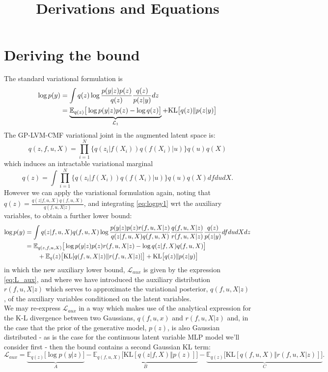 \documentclass[12pt]{article}
\title{\textbf{Derivations and Equations}}
\date{}
\begin{document}
\maketitle


\section{Deriving the bound} %
\label{sec:derive_bound}
The standard variational formulation is
%
\begin{align}
    \log p(y) &= \int q(z)\log\frac{p(y|z)p(z)}{q(z)}\frac{q(z)}{p(z|y)} dz\notag\\
    &= \underbrace{\mathbb{E}_{q(z)}\big[ \log p(y|z)p(z) - \log q(z) \big]}_{\mathcal{L}_1} + \text{KL}\big[ q(z)\Vert p(z|y) \big]\label{eq:logpy1}
\end{align}
%
The GP-LVM-CMF variational joint in the augmented latent space is:
%
\begin{equation}
    q(z,f,u,X) = \prod_{i=1}^N \{q(z_i|f(X_i))q(f(X_i)|u)\}q(u)q(X)
\end{equation}
%
which induces an intractable variational marginal
%
\begin{equation}
    q(z) = \int \prod_{i=1}^N \{q(z_i|f(X_i))q(f(X_i)|u)\}q(u)q(X) df du dX.
\end{equation}
%
However we can apply the variational formulation again, noting that $q(z) = \frac{q(z|f,u,X)q(f,u,X)}{q(f,u,X|z)}$, and integrating \ref{eq:logpy1} wrt the auxiliary variables, to obtain a further lower bound:
\begin{align}
    \log p(y) &= \int q(z|f,u,X)q(f,u,X)\log \frac{p(y|z)p(z)r(f,u,X|z)}{q(z|f,u,X)q(f,u,X)}\frac{q(f,u,X|z)}{r(f,u,X|z)}\frac{q(z)}{p(z|y)} df du dX dz\notag\\
    &= \mathbb{E}_{q(z,f,u,X)}\big[ \log p(y|z)p(z)r(f,u,X|z) - \log q(z|f,X)q(f,u,X) \big]\label{eq:L_aux}\\
    &\qquad+ \mathbb{E}_q(z)\big[ \text{KL}[q(f,u,X|z)\Vert r(f,u,X|z)] \big] + \text{KL}\big[ q(z)\Vert p(z|y) \big]
\end{align}
%
in which the new auxiliary lower bound, $\mathcal{L}_{aux}$ is given by the expression \ref{eq:L_aux}, and where we have introduced the auxiliary distribution $r(f,u,X|z)$ which serves to approximate the variational posterior, $q(f,u,X|z)$, of the auxiliary variables conditioned on the latent variables.\\
We may re-express $\mathcal{L}_{aux}$ in a way which makes use of the analytical expression for the K-L divergence between two Gaussians, $q(f,u,x)$ and $r(f,u,X|z)$ and, in the case that the prior of the generative model, $p(z)$, is also Gaussian distributed - as is the case for the continuous latent variable MLP model we'll consider first - then the bound contains a second Gaussian KL term:
%
\begin{equation}
    \mathcal{L}_{aux} = \underbrace{\mathbb{E}_{q(z)}\big[ \log p(y|z) \big]}_{A} - \underbrace{\mathbb{E}_{q(f,u,X)}\big[ \text{KL}[q(z|f,X)\Vert p(z)] \big]}_{B} - \underbrace{\mathbb{E}_{q(z)}\big[ \text{KL}[q(f,u,X)\Vert r(f,u,X|z)] \big]}_{C}.\label{eq:L_aux_ABC}
\end{equation}
%
%
\end{document}
